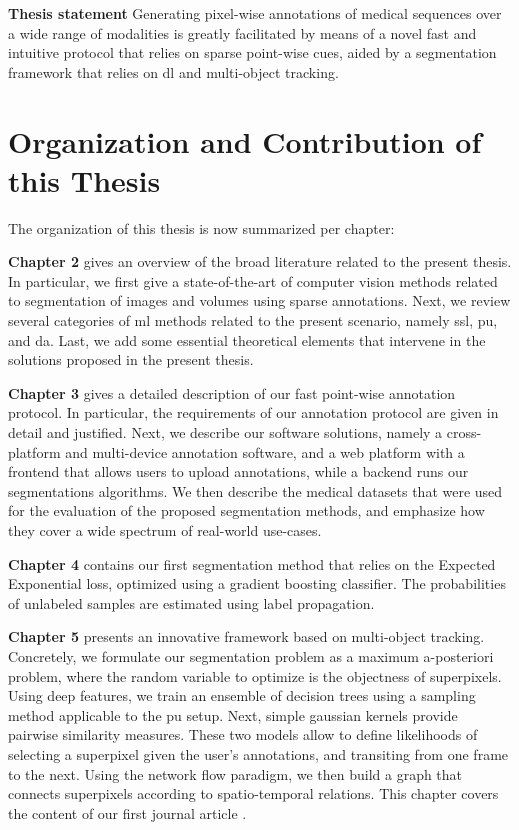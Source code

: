 \textbf{Thesis statement}
Generating pixel-wise annotations of medical sequences over a wide range of modalities is greatly facilitated by means of a novel fast and intuitive protocol that relies on sparse point-wise cues, aided by a segmentation framework that relies on \gls{dl} and multi-object tracking.


\section{Organization and Contribution of this Thesis}
The organization of this thesis is now summarized per chapter:

\textbf{Chapter 2} gives an overview of the broad literature related to the present thesis.
In particular, we first give a state-of-the-art of computer vision methods related to segmentation of images and volumes using sparse annotations.
Next, we review several categories of \gls{ml} methods related to the present scenario, namely \gls{ssl}, \gls{pu}, and \gls{da}.
Last, we add some essential theoretical elements that intervene in the solutions proposed in the present thesis.

\textbf{Chapter 3} gives a detailed description of our fast point-wise annotation protocol.
In particular, the requirements of our annotation protocol are given in detail and justified.
Next, we describe our software solutions, namely a cross-platform and multi-device annotation software, and a web platform with a frontend that allows users to upload annotations, while a backend runs our segmentations algorithms.
We then describe the medical datasets that were used for the evaluation of the proposed segmentation methods, and emphasize how they cover a wide spectrum of real-world use-cases.

\textbf{Chapter 4} contains our first segmentation method that relies on the Expected Exponential loss, optimized using a gradient boosting classifier. The probabilities of unlabeled samples are estimated using label propagation.

\textbf{Chapter 5} presents an innovative framework based on multi-object tracking.
Concretely, we formulate our segmentation problem as a maximum a-posteriori problem, where the random variable to optimize is the objectness of superpixels.
Using deep features, we train an ensemble of decision trees using a sampling method applicable to the \gls{pu} setup.
Next, simple gaussian kernels provide pairwise similarity measures.
These two models allow to define likelihoods of selecting a superpixel given the user's annotations, and transiting from one frame to the next.
Using the network flow paradigm, we then build a graph that connects superpixels according to spatio-temporal relations.
This chapter covers the content of our first journal article \cite{lejeune18}.

